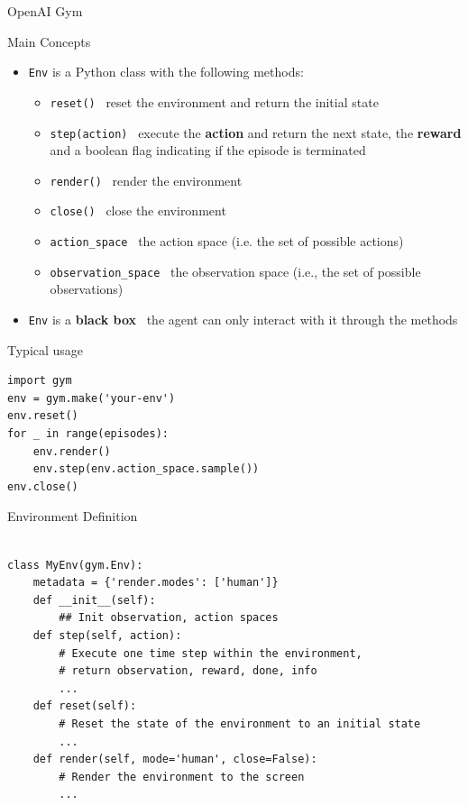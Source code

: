 \documentclass[presentation, 9pt]{beamer}\mode<presentation>{\usetheme{AMSBolognaFC}}
\begin{document}
\begin{frame}{OpenAI Gym}
\begin{block}{Main Concepts}
	\begin{itemize}
		\item \texttt{Env} is a Python class with the following methods:
		\begin{itemize}
			\item \texttt{reset()} \faArrowRight \, reset the environment and return the initial state
			\item \texttt{step(action)} \faArrowRight \, execute the \textbf{action} and return the next state, the \textbf{reward} and a boolean flag indicating if the episode is terminated
			\item \texttt{render()} \faArrowRight \, render the environment
			\item \texttt{close()} \faArrowRight \, close the environment
			\item \texttt{action\_space} \faArrowRight \, the action space (i.e. the set of possible actions)
			\item \texttt{observation\_space} \faArrowRight \, the observation space (i.e., the set of possible observations)
		\end{itemize}
		\item \texttt{Env} is a \textbf{black box} \faArrowRight \, the agent can only interact with it through the methods
	
	\end{itemize}
\end{block}
\begin{block}{Typical usage}
\begin{verbatim}
import gym
env = gym.make('your-env')
env.reset()
for _ in range(episodes):
	env.render()
	env.step(env.action_space.sample())
env.close()
\end{verbatim}
\end{block}
\begin{block}{Environment Definition}
\begin{verbatim}

class MyEnv(gym.Env):
	metadata = {'render.modes': ['human']}
	def __init__(self):
		## Init observation, action spaces
	def step(self, action):
		# Execute one time step within the environment, 
		# return observation, reward, done, info
		...
	def reset(self):
		# Reset the state of the environment to an initial state
		...
	def render(self, mode='human', close=False):
		# Render the environment to the screen
		...
	\end{verbatim}

\end{block}

\end{frame}
\end{document}
